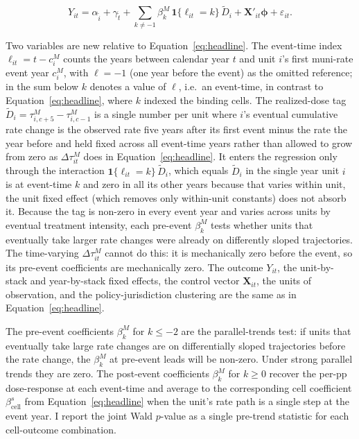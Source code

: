 \documentclass[12pt]{article}
\begin{document}
\begin{equation}
Y_{it} = \alpha_{\tilde i} + \gamma_{\tilde t}
+ \sum_{k \neq -1} \beta^M_k\, \mathbf{1}\{\ell_{it} = k\}\,
\widetilde{D}_i
+ \mathbf{X}'_{it}\boldsymbol{\phi} + \varepsilon_{it}.
\label{eq:realized-dose-es}
\end{equation}

Two variables are new relative to Equation~\ref{eq:headline}. The
event-time index $\ell_{it} = t - c^M_i$ counts the years between
calendar year $t$ and unit $i$'s first muni-rate event year $c^M_i$,
with $\ell = -1$ (one year before the event) as the omitted
reference; in the sum below $k$ denotes a value of $\ell$, i.e.\ an
event-time, in contrast to Equation~\ref{eq:headline}, where $k$
indexed the binding cells. The realized-dose tag
$\widetilde{D}_i = \tau^M_{i, c+5} - \tau^M_{i, c-1}$ is a single number per unit where $i$'s eventual cumulative rate
change is the observed rate five years after its first event minus the
rate the year before and held fixed across all event-time years rather
than allowed to grow from zero as $\Delta\tau^M_{it}$ does in
Equation~\ref{eq:headline}. It enters the regression only through the
interaction $\mathbf{1}\{\ell_{it}=k\}\,\widetilde{D}_i$, which equals
$\widetilde{D}_i$ in the single year unit $i$ is at event-time $k$ and
zero in all its other years because that varies within unit, the
unit fixed effect (which removes only within-unit constants) does not
absorb it. Because the tag is non-zero in every event year and varies across units by eventual treatment
intensity, each pre-event $\beta^M_k$ tests whether units that
eventually take larger rate changes were already on differently sloped
trajectories. The time-varying $\Delta\tau^M_{it}$ cannot do this: it
is mechanically zero before the event, so its pre-event coefficients
are mechanically zero. The outcome $Y_{it}$, the unit-by-stack and year-by-stack
fixed effects, the control vector $\mathbf{X}_{it}$, the units of
observation, and the policy-jurisdiction clustering are the same
as in Equation~\ref{eq:headline}.

The pre-event coefficients $\beta^M_k$ for $k \leq -2$ are the
parallel-trends test: if units that eventually take large rate
changes are on differentially sloped trajectories before the rate
change, the $\beta^M_k$ at pre-event leads will be non-zero. Under
strong parallel trends they are zero. The post-event coefficients
$\beta^M_k$ for $k \geq 0$ recover the per-pp dose-response at
each event-time and average to the corresponding cell coefficient
$\beta^s_{\text{cell}}$ from Equation~\ref{eq:headline} when the
unit's rate path is a single step at the event year. I report the
joint Wald $p$-value as a single pre-trend
statistic for each cell-outcome combination.
\end{document}
